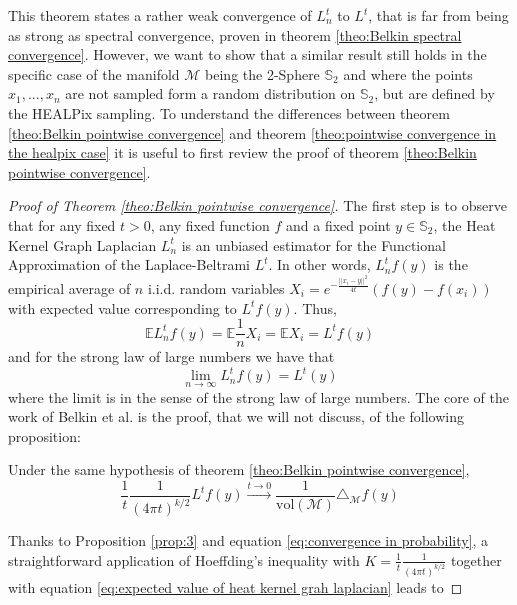 This theorem states a rather weak convergence of $L_n^t$ to $L^t$, that is far from being as strong as spectral convergence, proven in theorem \ref{theo:Belkin spectral convergence}. However, we want to show that a similar result still holds in the specific case of the manifold $\mathcal M$ being the 2-Sphere $\mathbb S_2$ and where the points $x_1, ..., x_n$ are not sampled form a random distribution on $\mathbb S_2$, but are defined by the HEALPix sampling. To understand the differences between theorem \ref{theo:Belkin pointwise convergence} and theorem \ref{theo:pointwise convergence in the healpix case} it is useful to first review the proof of theorem \ref{theo:Belkin pointwise convergence}.
\begin{proof}[Proof of Theorem \ref{theo:Belkin pointwise convergence}]
The first step is to observe that for any fixed $t>0$, any fixed function $f$ and a fixed point $y\in\mathbb S_2$,  the Heat Kernel Graph Laplacian $L_n^t$ is an unbiased estimator for the Functional Approximation of the Laplace-Beltrami $L^t$. In other words, $L_n^tf(y)$ is the empirical average of $n$ i.i.d. random variables $X_i= e^{-\frac{||x_i-y||^2}{4t}}\left(f(y)-f(x_i)\right)$ with expected value corresponding to $L^tf(y)$. Thus,
\begin{equation}
\label{eq:expected value of heat kernel grah laplacian}
	\mathbb E L_n^tf(y) = 	\mathbb E \frac{1}{n}X_i = \mathbb E X_i = L^tf(y)
\end{equation}
and for the strong law of large numbers we have that
\begin{equation}
\label{eq:convergence in probability}
\lim_{n\to\infty}L_n^tf(y) = L^t(y)
\end{equation}
where the limit is in the sense of the strong law of large numbers.
The core of the work of Belkin et al. is the proof, that we will not discuss, of the following proposition:

\begin{prop} Under the same hypothesis of theorem \ref{theo:Belkin pointwise convergence},
	$$\frac{1}{t}\frac{1}{(4\pi t)^{k/2}} L^tf(y) \xrightarrow{t\to 0 } \frac{1}{\text{vol}(\mathcal M)}\triangle_{\mathcal M}f(y)$$
	\label{prop:3}
\end{prop}

Thanks to Proposition \ref{prop:3} and equation \ref{eq:convergence in probability}, a straightforward application of Hoeffding's inequality with $K=\frac{1}{t}\frac{1}{(4\pi t)^{k/2}}$ together with equation  \ref{eq:expected value of heat kernel grah laplacian} leads to


\end{proof}

